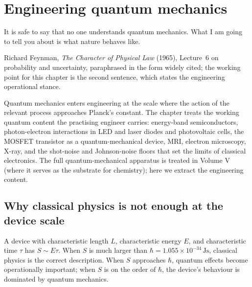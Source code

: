 \chapter{Engineering quantum mechanics}
\label{vol04:ch12}

\epigraph{It is safe to say that no one understands quantum mechanics.
What I am going to tell you about is what nature behaves like.}{Richard
Feynman, \emph{The Character of Physical Law} (1965), Lecture~6 on
probability and uncertainty, paraphrased in the form widely cited; the
working point for this chapter is the second sentence, which states the
engineering operational stance.}


\noindent
Quantum mechanics enters engineering at the scale where the action of
the relevant process approaches Planck's constant. The chapter treats
the working quantum content the practising engineer carries:
energy-band semiconductors, photon-electron interactions in
LED and laser diodes and photovoltaic cells, the MOSFET transistor as
a quantum-mechanical device, MRI, electron microscopy, X-ray, and the
shot-noise and Johnson-noise floors that set the limits of classical
electronics. The full quantum-mechanical apparatus is treated in
Volume V (where it serves as the substrate for chemistry); here we
extract the engineering content.

\section{Why classical physics is not enough at the device scale}

A device with characteristic length $L$, characteristic energy $E$,
and characteristic time $\tau$ has 
$S \sim E\tau$. When $S$ is much larger than $\hbar = 1.055\times
10^{-34}\,\si{\joule\second}$, classical physics is the correct
description. When $S$ approaches $\hbar$, quantum effects become
operationally important; when $S$ is on the order of $\hbar$, the
device's behaviour is dominated by quantum mechanics.


